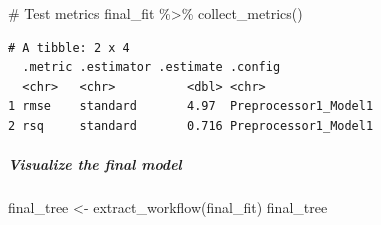 \documentclass[
]{article}
\let\oldsubparagraph\subparagraph
\renewcommand{\subparagraph}[1]{\oldsubparagraph{#1}\mbox{}}
\newenvironment{Shaded}{\begin{snugshade}}{\end{snugshade}}
\newcommand{\CommentTok}[1]{\textcolor[rgb]{0.37,0.37,0.37}{#1}}
\newcommand{\FunctionTok}[1]{\textcolor[rgb]{0.28,0.35,0.67}{#1}}
\newcommand{\NormalTok}[1]{\textcolor[rgb]{0.00,0.23,0.31}{#1}}
\newcommand{\OtherTok}[1]{\textcolor[rgb]{0.00,0.23,0.31}{#1}}
\newcommand{\SpecialCharTok}[1]{\textcolor[rgb]{0.37,0.37,0.37}{#1}}
\begin{document}
\begin{Shaded}
\begin{Highlighting}[]
\CommentTok{\# Test metrics}
\NormalTok{final\_fit }\SpecialCharTok{\%\textgreater{}\%} 
  \FunctionTok{collect\_metrics}\NormalTok{()}
\end{Highlighting}
\end{Shaded}

\begin{verbatim}
# A tibble: 2 x 4
  .metric .estimator .estimate .config             
  <chr>   <chr>          <dbl> <chr>               
1 rmse    standard       4.97  Preprocessor1_Model1
2 rsq     standard       0.716 Preprocessor1_Model1
\end{verbatim}

\hypertarget{visualize-the-final-model}{%
\subparagraph{Visualize the final
model}\label{visualize-the-final-model}}

\begin{Shaded}
\begin{Highlighting}[]
\NormalTok{final\_tree }\OtherTok{\textless{}{-}} \FunctionTok{extract\_workflow}\NormalTok{(final\_fit)}
\NormalTok{final\_tree}
\end{Highlighting}
\end{Shaded}
\end{document}
